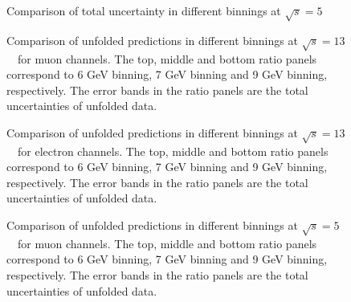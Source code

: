 \begin{figure}[h]
\centering
{}

\caption{Comparison of total uncertainty in different binnings at $\sqrt{s} = 5$~\TeV}\end{figure}

\begin{figure}[h]%
\centering
{}
\caption{Comparison of unfolded \ptw predictions in different binnings at $\sqrt{s} = 13$~\TeV\ for muon channels. The top, middle and bottom ratio panels correspond to 6 GeV binning, 7 GeV binning and 9 GeV binning, respectively. The error bands in the ratio panels are the total uncertainties of unfolded data.}\end{figure}

\begin{figure}[h]
\centering
{}
\caption{Comparison of unfolded \ptw predictions in different binnings at $\sqrt{s} = 13$~\TeV\ for electron channels. The top, middle and bottom ratio panels correspond to 6 GeV binning, 7 GeV binning and 9 GeV binning, respectively. The error bands in the ratio panels are the total uncertainties of unfolded data.}\end{figure}

\begin{figure}[h]
\centering
{}
\caption{Comparison of unfolded \ptw predictions in different binnings at $\sqrt{s} = 5$~\TeV\ for muon channels. The top, middle and bottom ratio panels correspond to 6 GeV binning, 7 GeV binning and 9 GeV binning, respectively. The error bands in the ratio panels are the total uncertainties of unfolded data.}\end{figure}

